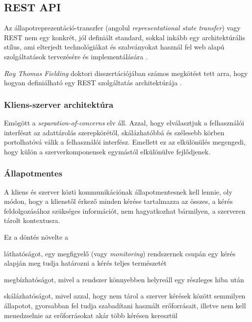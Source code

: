 \subsection{REST API}

Az állapotreprezentáció-transzfer (angolul \emph{representational state transfer}) vagy REST nem egy konkrét, jól definiált standard, sokkal inkább egy architektúrális stílus, ami elterjedt technológiákat és szabványokat használ fel web alapú szolgáltatások tervezésére és implementálására \cite{richards2006representational}. \par

\emph{Roy Thomas Fielding} doktori disszertációjában számos megkötést tett arra, hogy hogyan definiálható egy REST szolgáltatás architektúrája \cite{fielding2000architectural}. 

\subsubsection{Kliens-szerver architektúra}
Emögött a \emph{separation-of-concerns} elv áll. Azzal, hogy elválasztjuk a felhasználói interfészt az adattárolás szerepkörétől, skálázhatóbbá és szélesebb körben portolhatóvá válik a felhasználói interfész. Emellett ez az elkülönülés megengedi, hogy külön a szerverkomponensek egymástól elkülönülve fejlődjenek.

\subsubsection{Állapotmentes}
A kliens és szerver közti kommunikációnak állapotmentesnek kell lennie, oly módon, hogy a klienstől érkező minden kérése tartalmazza az összes, a kérés feldolgozásához szükséges információt, nem hagyatkozhat bármilyen, a szerveren tárolt kontextusra. \par

Ez a döntés növelte a 
\begin{listing}
	\item láthatóságot, egy megfigyelő (vagy \emph{monitoring}) rendszernek csupán egy kérés alapján meg tudja határozni a kérés teljes természetét
	\item megbízhatóságot, mivel a rendszer könnyebben helyreáll egy részleges hiba után
	\item skálázhatóságot, mivel azzal, hogy nem tárol a szerver kérések között semmilyen állapotot, gyorsabban fel tudja szabadítani használt erőforrásait, illetve nem kell menedzselnie az erőforrásokat akár több kérésen keresztül
\end{listing}

